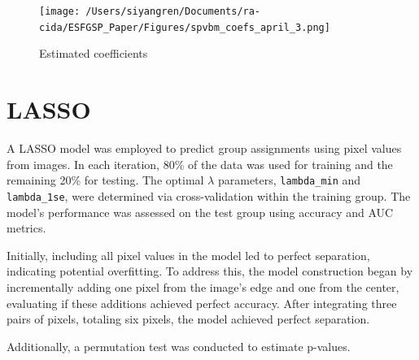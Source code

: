 \documentclass[12pt]{article}
\begin{document}
\begin{figure}[H]
    \centering
    \texttt{[image: /Users/siyangren/Documents/ra-cida/ESFGSP\_Paper/Figures/spvbm\_coefs\_april\_3.png]}
    \caption{Estimated coefficients}
    \label{fig:my_label}
\end{figure}

\section*{LASSO}

A LASSO model was employed to predict group assignments using pixel values from images. In each iteration, 80\% of the data was used for training and the remaining 20\% for testing. The optimal \(\lambda\) parameters, \texttt{lambda\_min} and \texttt{lambda\_1se}, were determined via cross-validation within the training group. The model's performance was assessed on the test group using accuracy and AUC metrics.

Initially, including all pixel values in the model led to perfect separation, indicating potential overfitting. To address this, the model construction began by incrementally adding one pixel from the image's edge and one from the center, evaluating if these additions achieved perfect accuracy. After integrating three pairs of pixels, totaling six pixels, the model achieved perfect separation.

Additionally, a permutation test was conducted to estimate p-values.
\end{document}

